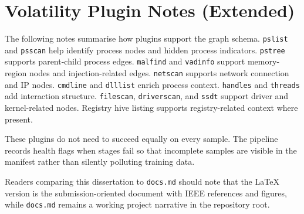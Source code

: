 \chapter{Volatility Plugin Notes (Extended)}
The following notes summarise how plugins support the graph schema. \texttt{pslist} and \texttt{psscan} help identify process nodes and hidden process indicators. \texttt{pstree} supports parent-child process edges. \texttt{malfind} and \texttt{vadinfo} support memory-region nodes and injection-related edges. \texttt{netscan} supports network connection and IP nodes. \texttt{cmdline} and \texttt{dlllist} enrich process context. \texttt{handles} and \texttt{threads} add interaction structure. \texttt{filescan}, \texttt{driverscan}, and \texttt{ssdt} support driver and kernel-related nodes. Registry hive listing supports registry-related context where present.

These plugins do not need to succeed equally on every sample. The pipeline records health flags when stages fail so that incomplete samples are visible in the manifest rather than silently polluting training data.

Readers comparing this dissertation to \texttt{docs.md} should note that the LaTeX version is the submission-oriented document with IEEE references and figures, while \texttt{docs.md} remains a working project narrative in the repository root.
